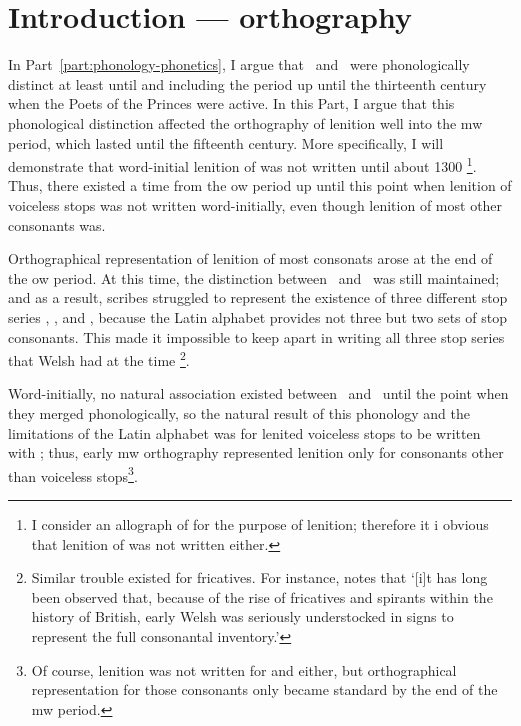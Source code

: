 \chapter{Introduction --- orthography}
\label{cha:intr-orth}

In Part~\ref{part:phonology-phonetics}, I argue that \lT\ and \xD\ were phonologically distinct at least until and including the period up until the thirteenth century when the Poets of the Princes were active. In this Part, I argue that this phonological distinction affected the orthography of lenition well into the \gls{mw} period, which lasted until the fifteenth century. More specifically, I will demonstrate that word-initial lenition of  was not written until about 1300%
\footnote{I consider  an allograph of  for the purpose of lenition; therefore it i obvious that lenition of  was not written either.}.
Thus, there existed a time from the \gls{ow} period up until this point when lenition of  voiceless stops was not written word-initially, even though lenition of most other consonants was.

Orthographical representation of lenition of most consonats arose at the end of the \gls{ow} period. At this time, the distinction between \lT\ and \xD\ was still maintained; and as a result, scribes struggled to represent the existence of three different stop series \xT, \lT, and \xD, because the Latin alphabet  provides not three but two sets of stop consonants. This made it impossible to keep apart in writing all three stop series that Welsh had at the time%
\footnote{Similar trouble existed for fricatives. For instance, \textcite[28]{russell_rowynniauc_2003} notes that `[i]t has long been observed that, because of the rise of fricatives and spirants within the history of British, early Welsh was seriously understocked in signs to represent the full consonantal inventory.'}.

Word-initially, no natural association existed between \lT\ and \xD\ until the point when they merged phonologically, so the natural result of this phonology and the limitations of the Latin alphabet was for lenited voiceless stops to be written with ; thus, early \gls{mw} orthography represented lenition only for consonants other than voiceless stops\footnote{Of course, lenition was not written for  and  either, but orthographical representation for those consonants only became standard by the end of the \gls{mw} period.}.

